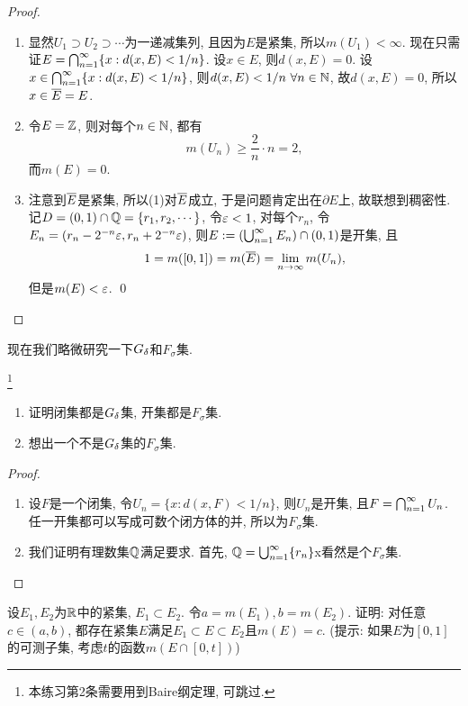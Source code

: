 \begin{proof}
    \begin{enumerate}
    \item 显然$U_1 \supset U_2 \supset \cdots$为一递减集列, 且因为$E$是紧集, 所以$m(U_1) < \infty$. 
    现在只需证$E = \bigcap_{n=1}^{\infty}\{x:d(x,E) < 1/n\}$. 设$x \in E$, 则$d(x,E)=0$. 设$x \in  \bigcap_{n=1}^{\infty}\{x:d(x,E) < 1/n\}$, 则$d(x,E) < 1/n~\forall n \in \mathbb{N}$, 故$d(x,E) = 0$, 所以$x \in \overline{E} = E$. 
    \item 令$E = \mathbb{Z}$, 则对每个$n \in \mathbb{N}$, 都有
    $$m(U_n) \geq \frac{2}{n} \cdot n = 2, $$
    而$m(E) = 0$. 
    \item 注意到$\overline{E}$是紧集, 所以(1)对$\overline{E}$成立, 于是问题肯定出在$\partial E$上, 故联想到稠密性. 记$D=(0,1) \cap \mathbb{Q} = \{r_1, r_2, \cdots\}$, 令$\varepsilon < 1$, 对每个$r_n$, 令$E_n = (r_n - 2^{-n}\varepsilon, r_n + 2^{-n}\varepsilon)$, 则$E := (\bigcup_{n=1}^{\infty}E_n) \cap (0,1)$是开集, 
    且$$ 1 = m([0,1]) = m(\overline{E}) = \lim_{n \to \infty}m(U_n), $$
    但是$m(E) < \varepsilon$. \qed 
    \end{enumerate}
\end{proof}

现在我们略微研究一下$G_\delta$和$F_\sigma$集.
\begin{exercise}\footnote{本练习第2条需要用到Baire纲定理, 可跳过.}
    \begin{enumerate}
    \item 证明闭集都是$G_\delta$集, 开集都是$F_\sigma$集.
    \item 想出一个不是$G_\delta$集的$F_\sigma$集.
    \end{enumerate}
\end{exercise}
\begin{proof}
    \begin{enumerate}
    \item 设$F$是一个闭集, 令$U_n = \{x: d(x,F) < 1/n\}$, 则$U_n$是开集, 且$F = \bigcap_{n=1}^{\infty}U_n$. 任一开集都可以写成可数个闭方体的并, 所以为$F_\sigma$集. 
    \item 我们证明有理数集$\mathbb{Q}$满足要求. 首先, $\mathbb{Q} = \bigcup_{n=1}^{\infty}\{r_n\}$x看然是个$F_\sigma$集. 
    \end{enumerate}
\end{proof}
\begin{exercise} %
    设$E_1,E_2$为$\mathbb{R}$中的紧集, $E_1 \subset E_2$. 令$a = m(E_1), b = m(E_2)$. 
    证明: 对任意$c \in (a,b)$, 都存在紧集$E$满足$E_1 \subset E \subset E_2$且$m(E)=c$. 
    (提示: 如果$E$为$[0,1]$的可测子集, 考虑$t$的函数$m(E \cap [0,t])$)
\end{exercise}

